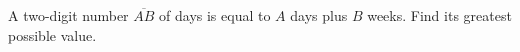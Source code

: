 A two-digit number $\overline{AB}$ of days is equal to $ A $ days plus $ B $ weeks. Find its greatest possible value.
